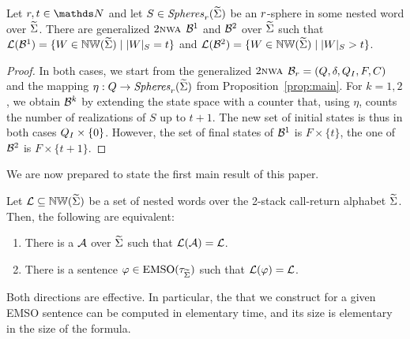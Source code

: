 \documentclass{LMCS}
\begin{document}
\begin{lem}\label{lem:counting}
  Let $\radius,t \in \N$ and let $S \in \mathit{Spheres}_r(\widetilde{\Sigma})$ be an
  $r$-sphere in some nested word over $\widetilde{\Sigma}$. There are generalized
  $2\textsc{nwa}$ $\mathcal{B}^1$ and $\mathcal{B}^2$ over $\widetilde{\Sigma}$ such that $\mathcal{L}(\mathcal{B}^1) = \{W
  \in \mathbb{NW}(\widetilde{\Sigma}) \mid |W|_S = t\}$ and $\mathcal{L}(\mathcal{B}^2) = \{W \in
  \mathbb{NW}(\widetilde{\Sigma}) \mid |W|_S > t\}$.
\end{lem}

\begin{proof}
  In both cases, we start from the generalized $2\textsc{nwa}$
  $\mathcal{B}_r=(Q,\delta,Q_I,F,C)$ and the mapping $\eta: Q \rightarrow
  \mathit{Spheres}_r(\widetilde{\Sigma})$ from Proposition~\ref{prop:main}. For
  $k=1,2$, we obtain $\mathcal{B}^k$ by extending the state space with a counter that,
  using $\eta$, counts the number of realizations of $S$ up to $t+1$. The new
  set of initial states is thus in both cases $Q_I \times \{0\}$. However,
  the set of final states of $\mathcal{B}^1$ is $F \times \{t\}$, the one of $\mathcal{B}^2$
  is $F \times \{t+1\}$.
\end{proof}

We are now prepared to state the first main result of this paper.

\begin{thm}\label{thm:equiv}
  Let $\mathcal{L} \subseteq \mathbb{NW}(\widetilde{\Sigma})$ be a set of nested words over the
  2-stack call-return alphabet $\widetilde{\Sigma}$. Then, the following are equivalent:
\begin{enumerate}[\em(1)]
\item There is a \tVPA $\mathcal{A}$ over $\widetilde{\Sigma}$ such that $\mathcal{L}(\mathcal{A}) = \mathcal{L}$.
\item There is a sentence $\varphi \in \textup{EMSO}(\tau_{\widetilde{\Sigma}})$ such that
  $\mathcal{L}(\varphi) = \mathcal{L}$.
\end{enumerate}
Both directions are effective. In particular, the \tVPA that we construct for
a given EMSO sentence can be computed in elementary time, and its size is
elementary in the size of the formula.
\end{thm}
\end{document}
